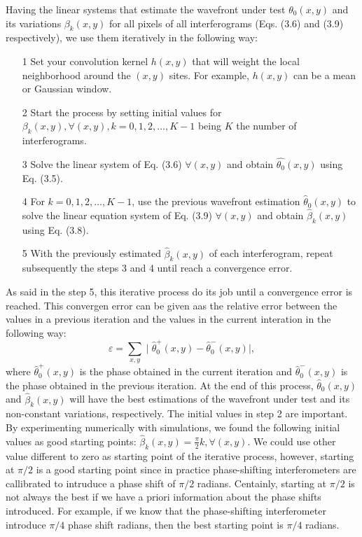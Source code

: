 Having the linear systems that estimate the wavefront under test $\theta_0(x,y)$
and its variations $\beta_k(x,y)$ for all pixels of all interferograms (Eqs.
(3.6) and (3.9) respectively), we use them iteratively in the following way:

\begin{itemize}
 \item[1] Set your convolution kernel $h(x,y)$ that will weight the local
 neighborhood around the $(x,y)$ sites. For example, $h(x,y)$ can be a mean or
 Gaussian window.
 \item[2] Start the process by setting initial values for $\beta_k(x,y),
 \forall (x,y), k = 0,1,2,\dots,K-1$ being $K$ the number of interferograms.
 \item[3] Solve the linear system of Eq. (3.6) $\forall(x,y)$ and obtain 
 $\hat{\theta_0} (x,y)$ using Eq. (3.5).
 \item[4] For $k = 0,1,2,\dots,K-1$, use the previous wavefront estimation
 $\hat{\theta}_0 (x,y)$ to solve the linear equation system of Eq. (3.9)
 $\forall(x,y)$ and obtain $\hat{\beta}_k(x,y)$ using Eq. (3.8).
 \item[5] With the previously estimated $\hat{\beta}_k(x,y)$ of each
 interferogram, repeat subsequently the steps 3 and 4 until reach a convergence
 error.
\end{itemize}
As said in the step 5, this iterative process do its job until a convergence
error is reached. This convergen error can be given aas the relative error
between the values in a previous iteration and the values in the current
interation in the following way:
\begin{equation}
 \varepsilon=\sum_{x,y}\mid\hat{\theta}_{0}^{+}(x,y)-\hat{\theta}_{0}^{-}(x,y)
 \mid,
\end{equation}
where $\hat{\theta}_{0}^{+}(x,y)$ is the phase obtained in the current iteration
and $\hat{\theta}_{0}^{-}(x,y)$ is the phase obtained in the previous iteration.
At the end of this process, $\hat{\theta}_{0}(x,y)$ and $\hat{\beta}_k(x,y)$
will have the best estimations of the wavefront under test and its non-constant
variations, respectively. The initial values in step 2 are important. By
experimenting numerically with simulations, we found the following initial
values as good starting points: $\hat{\beta}_k(x,y) = \frac{\pi}{2}k, 
\forall(x,y)$. We could use other value different to zero as starting point of
the iterative process, however, starting at $\pi/2$ is a good starting point
since in practice phase-shifting interferometers are callibrated to intruduce
a phase shift of $\pi/2$ radians. Centainly, starting at $\pi/2$ is not always
the best if we have a priori information about the phase shifts introduced. For
example, if we know that the phase-shifting interferometer introduce $\pi/4$
phase shift radians, then the best starting point is $\pi/4$ radians.

